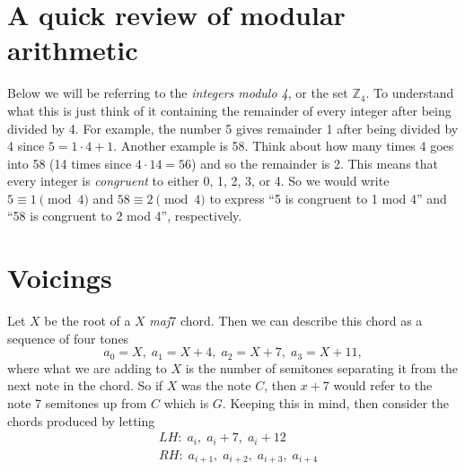 \documentclass{article}
\theoremstyle{definition}
\theoremstyle{remark}
\theoremstyle{example}
\begin{document}
\section{A quick review of modular arithmetic}
Below we will be referring to the \textit{integers modulo 4}, or the set $\mathbb{Z}_4$. To understand what this is just think of it containing the remainder of every integer after being divided by 4. For example, the number 5 gives remainder 1 after being divided by 4 since $5=1\cdot4+1$. Another example is 58. Think about how many times 4 goes into 58 (14 times since $4\cdot14=56$) and so the remainder is 2. This means that every integer is \textit{congruent} to either 0, 1, 2, 3, or 4. So we would write $5\equiv 1\pmod{4}$ and $58\equiv 2\pmod{4}$ to express ``5 is congruent to 1 mod 4'' and ``58 is congruent to 2 mod 4'', respectively. 

\section{Voicings}
Let $X$ be the root of a $X$ \textit{maj}7 chord. Then we can describe this chord as a sequence of four tones
    \begin{equation*}
        a_0=X,\;a_1=X+4,\;a_2=X+7,\;a_3=X+11,
    \end{equation*}
where what we are adding to $X$ is the number of semitones separating it from the next note in the chord. So if $X$ was the note $C$, then $x+7$ would refer to the note 7 semitones up from $C$ which is $G$. Keeping this in mind, then consider the chords produced by letting 
    \begin{align*}
        &LH:\;a_i,\; a_i+7,\; a_i+12 \\
        &RH:\;a_{i+1},\; a_{i+2},\;a_{i+3},\;a_{i+4}
    \end{align*}
\end{document}
